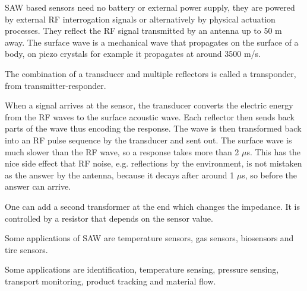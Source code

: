\begin{mytitle} SAW based sensors need no battery or external power supply, they are powered by external RF interrogation signals or alternatively by physical actuation processes. They reflect the RF signal transmitted by an antenna up to 50 m away. The surface wave is a mechanical wave that propagates on the surface of a body, on piezo crystals for example it propagates at around 3500 m/s.
    \begin{mysubtitle} The combination of a transducer and multiple reflectors is called a transponder, from transmitter-responder.
    \end{mysubtitle}
    \begin{mysubtitle} When a signal arrives at the sensor, the transducer converts the electric energy from the RF waves to the surface acoustic wave. Each reflector then sends back parts of the wave thus encoding the response. The wave is then transformed back into an RF pulse sequence by the transducer and sent out. The surface wave is much slower than the RF wave, so a response takes more than 2 $\mu$s. This has the nice side effect that RF noise, e.g. reflections by the environment, is not mistaken as the answer by the antenna, because it decays after around 1 $\mu$s, so before the answer can arrive.
    \end{mysubtitle}
    \begin{mysubtitle} One can add a second transformer at the end which changes the impedance. It is controlled by a resistor that depends on the sensor value.
    \end{mysubtitle}
\end{mytitle}
\begin{mytitle}[Applications]
    \begin{mysubtitle} Some applications of SAW are temperature sensors, gas sensors, biosensors and tire sensors.
    \end{mysubtitle}
    \begin{mysubtitle} Some applications are identification, temperature sensing, pressure sensing, transport monitoring, product tracking and material flow.
    \end{mysubtitle}
\end{mytitle}

